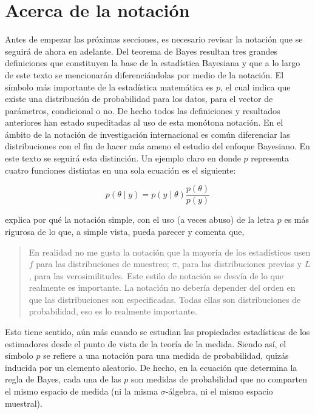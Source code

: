\documentclass[
  10pt,
  spanish,
]{book}
\theoremstyle{definition}
\theoremstyle{definition}
\theoremstyle{definition}
\theoremstyle{definition}
\theoremstyle{remark}
\begin{document}
\hypertarget{acerca-de-la-notaciuxf3n}{%
\section*{Acerca de la notación}\label{acerca-de-la-notaciuxf3n}}

Antes de empezar las próximas secciones, es necesario revisar la
notación que se seguirá de ahora en adelante. Del teorema de Bayes
resultan tres grandes definiciones que constituyen la base de la
estadística Bayesiana y que a lo largo de este texto se mencionarán
diferenciándolas por medio de la notación. El símbolo más importante de
la estadística matemática es \(p\), el cual indica que existe una
distribución de probabilidad para los datos, para el vector de
parámetros, condicional o no. De hecho todos las definiciones y
resultados anteriores han estado supeditadas al uso de esta monótona
notación. En el ámbito de la notación de investigación internacional es
común diferenciar las distribuciones con el fin de hacer más ameno el
estudio del enfoque Bayesiano. En este texto se seguirá esta distinción.
Un ejemplo claro en donde \(p\) representa cuatro funciones distintas en
una sola ecuación es el siguiente:

\[p(\theta \mid y)=p(y \mid \theta)\frac{p(\theta)}{p(y)}\]

\citet{Gelman95} explica por qué la notación simple, con el uso (a
veces abuso) de la letra \(p\) es más rigurosa de lo que, a simple vista,
pueda parecer y comenta que,

\begin{quote}
En realidad no me gusta la notación que la mayoría de los estadísticos usen \(f\) para las distribuciones de muestreo; \(\pi\), para las distribuciones previas y \(L\), para las verosimilitudes. Este estilo de notación se desvía de lo que realmente es importante. La notación no debería depender del orden en que las distribuciones son especificadas. Todas ellas son distribuciones de probabilidad, eso es lo realmente importante.
\end{quote}

Esto tiene sentido, aún más cuando se estudian las propiedades
estadísticas de los estimadores desde el punto de vista de la teoría de
la medida. Siendo así, el símbolo \(p\) se refiere a una notación para una
medida de probabilidad, quizás inducida por un elemento aleatorio. De
hecho, en la ecuación que determina la regla de Bayes, cada una de las
\(p\) son medidas de probabilidad que no comparten el mismo espacio de
medida (ni la misma \(\sigma\)-álgebra, ni el mismo espacio muestral).
\end{document}
